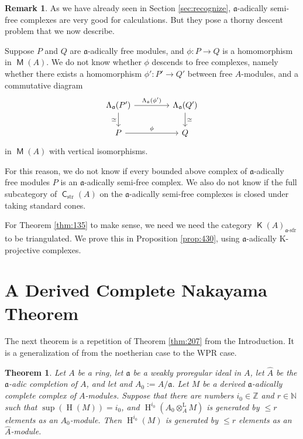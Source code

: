 \documentclass[10pt]{amsart}
\newtheorem{thm}[equation]{Theorem}
\theoremstyle{definition}
\newtheorem{rem}[equation]{Remark}
\numberwithin{equation}{section}
\newcommand{\opn}{\operatorname}
\newcommand{\cat}[1]{\operatorname{\mathsf{#1}}}
\newcommand{\mfrak}[1]{\mathfrak{#1}}
\newcommand{\mrm}[1]{\mathrm{#1}}
\newcommand{\La}{\Lambda}
\renewcommand{\a}{\mfrak{a}}
\newcommand{\Z}{\mathbb{Z}}
\newcommand{\N}{\mathbb{N}}
\newcommand{\tup}[1]{\textrm{#1}}
\newcommand{\ot}{\otimes}
\newcommand{\what}[1]{\widehat{#1}}
\begin{document}
\begin{rem} \label{rem:155}
As we have already seen in Section \ref{sec:recognize},
$\a$-adically semi-free complexes are very good for calculations.
But they pose a thorny descent problem that we now describe.

Suppose $P$ and $Q$ are $\a$-adically free modules, and $\phi : P \to Q$
is a homomorphism in $\cat{M}(A)$. We do not know whether $\phi$
descends to free complexes, namely whether there exists
a homomorphism $\phi' : P' \to Q'$ between free $A$-modules,
and a commutative diagram
\[ \begin{tikzcd} [column sep = 10ex, row sep = 4ex]
\La_{\a}(P')
\ar[d, "{\simeq}"']
\ar[r, "{\La_{\a}(\phi')}"]
&
\La_{\a}(Q')
\ar[d, "{\simeq}"]
\\
P
\ar[r, "{\phi}"]
&
Q
\end{tikzcd} \]
in $\cat{M}(A)$ with vertical isomorphisms.

For this reason, we do not know if every bounded above complex of
$\a$-adically free modules $P$ is an $\a$-adically semi-free complex.
We also do not know if the full subcategory of $\cat{C}_{\mrm{str}}(A)$ on
the $\a$-adically semi-free complexes is closed under taking standard cones.

For Theorem \ref{thm:135} to make sense, we need we need the category
$\cat{K}(A)_{\tup{$\a$-sfr}}$ to be triangulated.
We prove this in Proposition \ref{prop:430}, using $\a$-adically K-projective
complexes.
\end{rem}



\section{A Derived Complete Nakayama Theorem}
\label{sec:nakayama}

The next theorem is a repetition of Theorem \ref{thm:207} from the
Introduction. It is a generalization of \cite[Theorem 2.2]{PSY2} from the
noetherian case to the WPR case.

\begin{thm} \label{thm:104}
Let $A$ be a ring, let $\a$ be a weakly proregular ideal in $A$, let
$\what{A}$ be the $\a$-adic completion of $A$, and let
and $A_0 := A / \a$.
Let $M$ be a derived $\a$-adically complete complex of $A$-modules.
Suppose that there are numbers $i_0 \in \Z$ and $r \in \N$ such that
$\opn{sup}(\opn{H}(M)) = i_0$,
and $\opn{H}^{i_0}(A_0 \ot^{\mrm{L}}_{A} M)$
is generated by $\leq r$ elements as an $A_0$-module.
Then $\opn{H}^{i_0}(M)$ is generated by $\leq r$ elements as an
$\what{A}$-module.
\end{thm}
\end{document}
